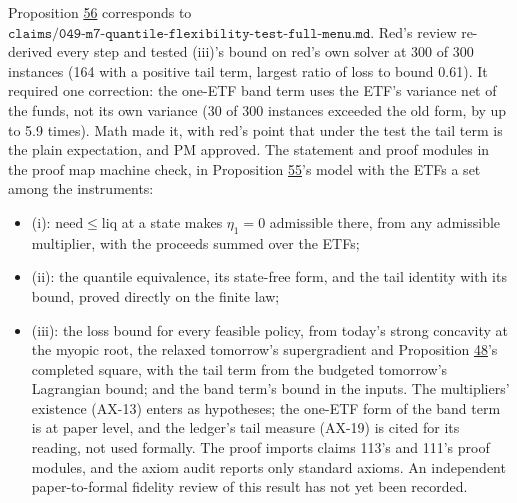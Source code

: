 \documentclass[11pt]{article}
\begin{document}
Proposition \hyperref[res:Proposition-56]{56} corresponds to
\(\texttt{claims/049-m7-quantile-flexibility-test-full-menu.md}\). Red's review
re-derived every step and tested (iii)'s bound on red's own solver at
300 of 300 instances (164 with a positive tail term, largest ratio of
loss to bound 0.61). It required one correction: the one-ETF band term
uses the ETF's variance net of the funds, not its own variance (30 of
300 instances exceeded the old form, by up to 5.9 times). Math made it,
with red's point that under the test the tail term is the plain
expectation, and PM approved. The statement and proof modules in the
proof map machine check, in Proposition \hyperref[res:Proposition-55]{55}'s model with the ETFs a set
among the instruments:

\begin{itemize}
  \item (i): \(\mathrm{need}\leq\mathrm{liq}\) at a state makes \(\eta_1=0\) admissible there, from any
  admissible multiplier, with the proceeds summed over the ETFs;
  \item (ii): the quantile equivalence, its state-free form, and the tail
  identity with its bound, proved directly on the finite law;
  \item (iii): the loss bound for every feasible policy, from today's strong
  concavity at the myopic root, the relaxed tomorrow's supergradient
  and Proposition \hyperref[res:Proposition-48]{48}'s completed square, with the tail term from the
  budgeted tomorrow's Lagrangian bound; and the band term's bound in
  the inputs.
The multipliers' existence (AX-13) enters as hypotheses; the one-ETF
form of the band term is at paper level, and the ledger's tail measure
(AX-19) is cited for its reading, not used formally. The proof imports
claims 113's and 111's proof modules, and the axiom audit reports only
standard axioms. An independent paper-to-formal fidelity review
of this result has not yet been recorded.
\end{itemize}
\end{document}
